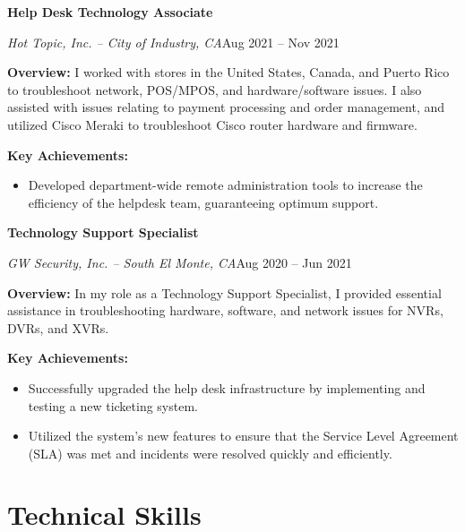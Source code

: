 \documentclass[a4paper]{article}
\begin{document}
\vspace{10pt}
\begin{minipage}{\textwidth}
\textbf{Help Desk Technology Associate}\par
\textit{Hot Topic, Inc. -- City of Industry, CA}\hfill Aug 2021 -- Nov 2021

\medskip
\textbf{Overview:} I worked with stores in the United States, Canada, and Puerto Rico to troubleshoot network, POS/MPOS, and hardware/software issues. I also assisted with issues relating to payment processing and order management, and utilized Cisco Meraki to troubleshoot Cisco router hardware and firmware.

\medskip
\textbf{Key Achievements:}
\begin{itemize}
    \item Developed department-wide remote administration tools to increase the efficiency of the helpdesk team, guaranteeing optimum support.
\end{itemize}
\end{minipage}

\vspace{10pt}
\begin{minipage}{\textwidth}
\textbf{Technology Support Specialist}\par
\textit{GW Security, Inc. -- South El Monte, CA}\hfill Aug 2020 -- Jun 2021

\medskip
\textbf{Overview:} In my role as a Technology Support Specialist, I provided essential assistance in troubleshooting hardware, software, and network issues for NVRs, DVRs, and XVRs.

\medskip
\textbf{Key Achievements:}
\begin{itemize}
    \item Successfully upgraded the help desk infrastructure by implementing and testing a new ticketing system.
    \item Utilized the system's new features to ensure that the Service Level Agreement (SLA) was met and incidents were resolved quickly and efficiently.
\end{itemize}
\end{minipage}

\section{Technical Skills}
\begin{minipage}{\textwidth}
\begin{itemize}
    \apptechnicalskills{}
\end{itemize}
\end{minipage}
\end{document}
